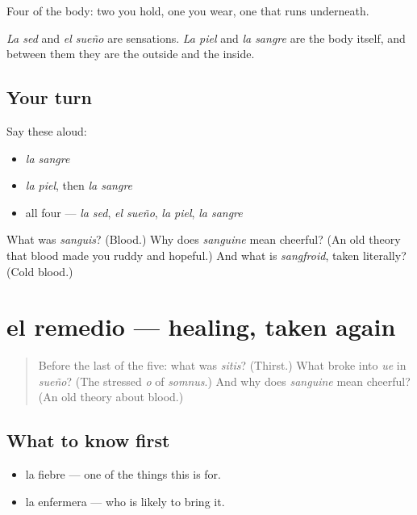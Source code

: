 \begin{grammarlens}[title={What you've built}]
Four of the body: two you hold, one you wear, one that runs underneath.

\emph{La sed} and \emph{el sueño} are sensations. \emph{La piel} and \emph{la sangre} are the body itself, and between them they are the outside and the inside.
\end{grammarlens}

\subsection*{Your turn}
Say these aloud:

\begin{itemize}
\raggedright
  \item \emph{la sangre}
  \item \emph{la piel}, then \emph{la sangre}
  \item all four — \emph{la sed}, \emph{el sueño}, \emph{la piel}, \emph{la sangre}
\end{itemize}

\begin{tcolorbox}[breakable,colback=teal!4,colframe=teal!35!black,title={Before you move on}]
What was \emph{sanguis}? (Blood.) Why does \emph{sanguine} mean cheerful? (An old theory that blood made you ruddy and hopeful.) And what is \emph{sangfroid}, taken literally? (Cold blood.)
\end{tcolorbox}
\section[el remedio]{el remedio — healing, taken again}

\label{lesson:ES-C300-remedio}



\begin{quote}
Before the last of the five: what was \emph{sitis}? (Thirst.) What broke into \emph{ue} in \emph{sueño}? (The stressed \emph{o} of \emph{somnus}.) And why does \emph{sanguine} mean cheerful? (An old theory about blood.)
\end{quote}

\subsection*{What to know first}
\begin{itemize}
\raggedright
  \item la fiebre — one of the things this is for.
  \item la enfermera — who is likely to bring it.
\end{itemize}

